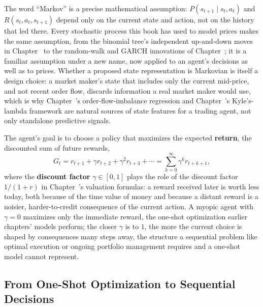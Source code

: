 \documentclass[../ai_in_finance]{subfiles}
\begin{document}
The word ``Markov'' is a precise mathematical assumption: $P(s_{t+1} \mid s_t, a_t)$ and $R(s_t, a_t, s_{t+1})$ depend only on the current state and action, not on the history that led there. Every stochastic process this book has used to model prices makes the same assumption, from the binomial tree's independent up-and-down moves in Chapter~ to the random-walk and GARCH innovations of Chapter~; it is a familiar assumption under a new name, now applied to an agent's decisions as well as to prices. Whether a proposed state representation is Markovian is itself a design choice: a market maker's state that includes only the current mid-price, and not recent order flow, discards information a real market maker would use, which is why Chapter~'s order-flow-imbalance regression and Chapter~'s Kyle's-lambda framework are natural sources of state features for a trading agent, not only standalone predictive signals.

The agent's goal is to choose a policy that maximizes the expected \textbf{return}, the discounted sum of future rewards,
\begin{equation}
G_t = r_{t+1} + \gamma r_{t+2} + \gamma^2 r_{t+3} + \cdots = \sum_{k=0}^{\infty} \gamma^k r_{t+k+1},
\label{eq:rl-return}
\end{equation}
where the \textbf{discount factor} $\gamma \in [0,1]$ plays the role of the discount factor $1/(1+r)$ in Chapter~'s valuation formulas: a reward received later is worth less today, both because of the time value of money and because a distant reward is a noisier, harder-to-credit consequence of the current action. A myopic agent with $\gamma = 0$ maximizes only the immediate reward, the one-shot optimization earlier chapters' models perform; the closer $\gamma$ is to $1$, the more the current choice is shaped by consequences many steps away, the structure a sequential problem like optimal execution or ongoing portfolio management requires and a one-shot model cannot represent.

\subsection{From One-Shot Optimization to Sequential Decisions}
\label{sec:rl-bridge}
\end{document}
